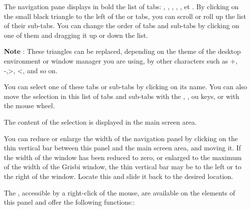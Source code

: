 The navigation pane displays in bold the list of tabs:  , , , , ,  et . By clicking on the small black triangle to the left of the   or  tabs,  you can scroll or roll up the list of their sub-tabs. You can change the order of tabs and sub-tabs by clicking on one of them and dragging it up or down the list.

\textbf{Note} : These triangles can be replaced, depending on the theme of the desktop environment or window manager you are using, by other characters such as +, -,>, <, and so on.


You can select one of these tabs or sub-tabs by clicking on its name. You can also move the selection in this list of tabs and sub-tabs with the , ,  ou  keys, or with the mouse wheel. 

The content of the selection is displayed in the main screen area.

You can reduce or enlarge the width of the navigation panel by clicking on the thin vertical bar between this panel and the main screen area, and moving it. If the width of the window has been reduced to zero, or enlarged to the maximum of the width of the Grisbi window, the thin vertical bar may be to the left or to the right of the window.  Locate this and slide it back to the desired location.


The ,  accessible by a right-click of the mouse, are available on the elements of this panel and offer the following functions::

